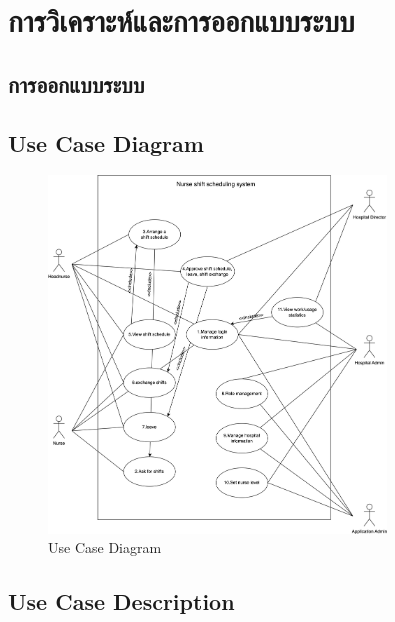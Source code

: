 \baselineskip=8mm
\chapter{การวิเคราะห์และการออกแบบระบบ}

\renewcommand{\thesubsection}{\arabic{subsection}.}
\renewcommand{\theequation}{\thesection.\arabic{equation}}
\renewcommand{\thesection}{}


\section{การออกแบบระบบ}


\section{Use Case Diagram}
\begin{figure}[h]
    \centering
    \includegraphics[width=0.8\textwidth]{UseCase.png}
    \caption{Use Case Diagram}
    \end{figure}
\clearpage


\section{Use Case Description}


